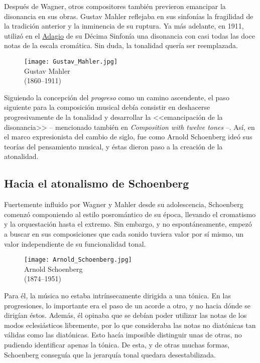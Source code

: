 Después de Wagner, otros compositores también previeron emancipar la disonancia en sus obras. Gustav Mahler reflejaba en sus sinfonías la fragilidad de la tradición anterior y la inminencia de su ruptura. Ya más adelante, en 1911, utilizó en el \href{https://www.youtube.com/watch?v=vHyV8noUXC0}{Adagio} de su Décima Sinfonía una disonancia con casi todas las doce notas de la escala cromática. Sin duda, la tonalidad quería ser reemplazada.
%
\cite{aguirre}

\begin{figure}[h]
\begin{center}
\texttt{[image: Gustav\_Mahler.jpg]}\\
{Gustav Mahler\\(1860--1911)}
\end{center}
\end{figure}

Siguiendo la concepción del \emph{progreso} como un camino ascendente, el paso siguiente para la composición musical debía consistir en deshacerse progresivamente de la tonalidad y desarrollar la <<{emancipación de la disonancia}>> -- mencionado también en {\emph{Composition with twelve tones}} --. Así, en el marco expresionista del cambio de siglo, fue como Arnold Schoenberg ideó sus teorías del pensamiento musical, y éstas dieron paso a la creación de la atonalidad.

\subsection{Hacia el atonalismo de Schoenberg}
Fuertemente influido por Wagner y Mahler desde su adolescencia, Schoenberg comenzó componiendo al estilo posromántico de su época, llevando el cromatismo y la orquestación hasta el extremo. Sin embargo, y no espontáneamente, empezó a buscar en sus composiciones que cada sonido tuviera valor por sí mismo, un valor independiente de su funcionalidad tonal.

\begin{figure}[h]
\begin{center}
\texttt{[image: Arnold\_Schoenberg.jpg]}\\
{Arnold Schoenberg\\(1874--1951)}
\end{center}
\end{figure}
Para él, la música no estaba intrínsecamente dirigida a una tónica. En las progresiones, lo importante era el paso de un acorde a otro, y no hacia dónde se dirigían éstos. Además, él opinaba que se debían poder utilizar las notas de los modos eclesiásticos libremente, por lo que consideraba las notas no diatónicas tan válidas como las diatónicas. Esto hacía imposible distinguir unas de otras, no pudiendo identificar apenas la tónica. De esta, y de otras muchas formas, Schoenberg conseguía que la jerarquía tonal quedara desestabilizada.
%
\cite{kinney}

